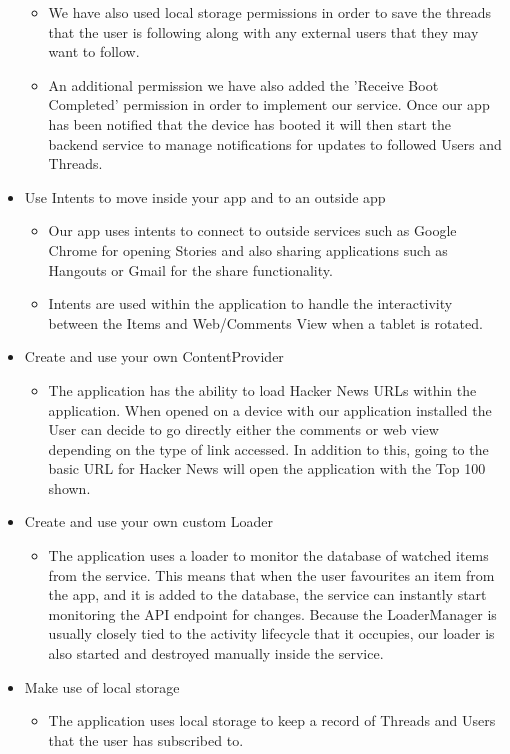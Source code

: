 \documentclass[11pt]{article}
\begin{document}
\begin{itemize}
\begin{itemize}
		\item{We have also used local storage permissions in order to save the threads that the user is following along with any external users that they may want to follow.}
		\item{An additional permission we have also added the 'Receive Boot Completed' permission in order to implement our service. Once our app has been notified that the device has booted it will then start the backend service to manage notifications for updates to followed Users and Threads.}
	\end{itemize}
	\item{Use Intents to move inside your app and to an outside app}
	\begin{itemize}
		\item{Our app uses intents to connect to outside services such as Google Chrome for opening Stories and also sharing applications such as Hangouts or Gmail for the share functionality.}
		\item{Intents are used within the application to handle the interactivity between the Items and Web/Comments View when a tablet is rotated.}
	\end{itemize}
	\item{Create and use your own ContentProvider}
	\begin{itemize}
		\item{The application has the ability to load Hacker News URLs within the application. When opened on a device with our application installed the User can decide to go directly either the comments or web view depending on the type of link accessed. In addition to this, going to the basic URL for Hacker News will open the application with the Top 100 shown.}
	\end{itemize}
	\item{Create and use your own custom Loader}
	\begin{itemize}
			\item{The application uses a loader to monitor the database of watched items from the service. This means that when the user favourites an item from the app, and it is added to the database, the service can instantly start monitoring the API endpoint for changes. Because the LoaderManager is usually closely tied to the activity lifecycle that it occupies, our loader is also started and destroyed manually inside the service.}	
	\end{itemize}		
	\item{Make use of local storage}
	\begin{itemize}
		\item{The application uses local storage to keep a record of Threads and Users that the user has subscribed to.}
	\end{itemize}
\end{itemize}
\end{document}
